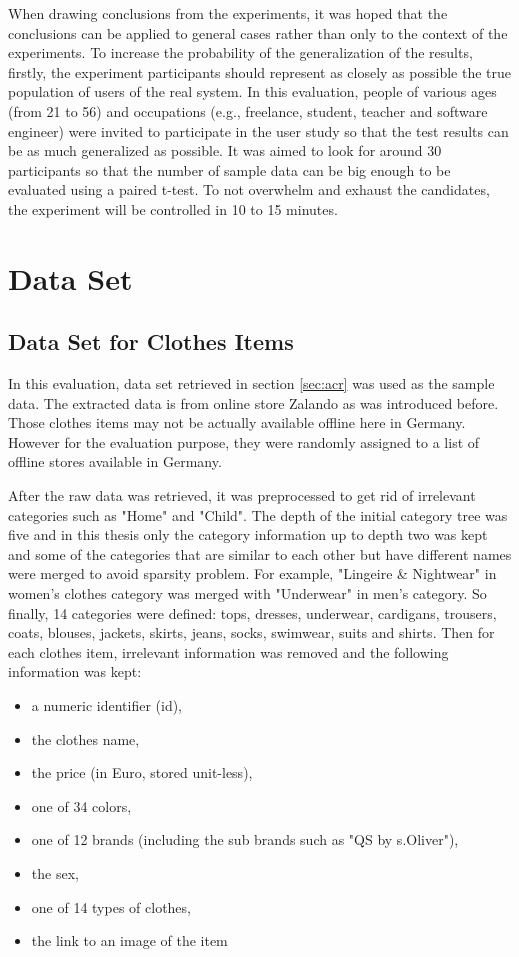 When drawing conclusions from the experiments, it was hoped that the conclusions can be applied to general cases rather than only to the context of the experiments. To increase the probability of the generalization of the results, firstly, the experiment participants should represent as closely as possible the true population of users of the real system. In this evaluation, people of various ages (from 21 to 56) and occupations (e.g., freelance, student, teacher and software engineer) were invited to participate in the user study so that the test results can be as much generalized as possible. It was aimed to look for around 30 participants so that the number of sample data can be big enough to be evaluated using a paired t-test. To not overwhelm and exhaust the candidates, the experiment will be controlled in 10 to 15 minutes.

\section{Data Set} \label{sec:ds}

\subsection{Data Set for Clothes Items} \label{sec:ds_ci}

In this evaluation, data set retrieved in section \ref{sec:acr} was used as the sample data. The extracted data is from online store Zalando as was introduced before. Those clothes items may not be actually available offline here in Germany. However for the evaluation purpose, they were randomly assigned to a list of offline stores available in Germany. 

After the raw data was retrieved, it was preprocessed to get rid of irrelevant categories such as "Home" and "Child". The depth of the initial category tree was five and in this thesis only the category information up to depth two was kept and some of the categories that are similar to each other but have different names were merged to avoid sparsity problem. For example, "Lingeire \& Nightwear" in women's clothes category was merged with "Underwear" in men's category. So finally, 14 categories were defined: tops, dresses, underwear, cardigans, trousers, coats, blouses, jackets, skirts, jeans, socks, swimwear, suits and shirts. Then for each clothes item, irrelevant information was removed and the following information was kept:
\begin{itemize}
	\item{a numeric identifier (id),}
	\item{the clothes name,}
	\item{the price (in Euro, stored unit-less),}
	\item{one of 34 colors,}
	\item{one of 12 brands (including the sub brands such as "QS by s.Oliver"),}
	\item{the sex,}
	\item{one of 14 types of clothes,}
	\item{the link to an image of the item}
\end{itemize}

